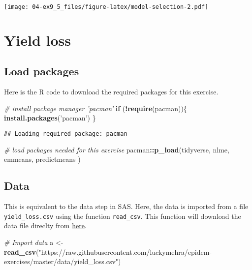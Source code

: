 \documentclass[]{book}
\newenvironment{Shaded}{\begin{snugshade}}{\end{snugshade}}
\newcommand{\CommentTok}[1]{\textcolor[rgb]{0.56,0.35,0.01}{\textit{#1}}}
\newcommand{\ControlFlowTok}[1]{\textcolor[rgb]{0.13,0.29,0.53}{\textbf{#1}}}
\newcommand{\KeywordTok}[1]{\textcolor[rgb]{0.13,0.29,0.53}{\textbf{#1}}}
\newcommand{\NormalTok}[1]{#1}
\newcommand{\OperatorTok}[1]{\textcolor[rgb]{0.81,0.36,0.00}{\textbf{#1}}}
\newcommand{\StringTok}[1]{\textcolor[rgb]{0.31,0.60,0.02}{#1}}
\begin{document}
\texttt{[image: 04-ex9\_5\_files/figure-latex/model-selection-2.pdf]}

\hypertarget{yieldloss}{%
\chapter{Yield loss}\label{yieldloss}}

\hypertarget{load-packages-4}{%
\section{Load packages}\label{load-packages-4}}

Here is the R code to download the required packages for this exercise.

\begin{Shaded}
\begin{Highlighting}[]
\CommentTok{# install package manager 'pacman'}
\ControlFlowTok{if}\NormalTok{ (}\OperatorTok{!}\KeywordTok{require}\NormalTok{(pacman))\{}
  \KeywordTok{install.packages}\NormalTok{(}\StringTok{'pacman'}\NormalTok{)}
\NormalTok{\}}
\end{Highlighting}
\end{Shaded}

\begin{verbatim}
## Loading required package: pacman
\end{verbatim}

\begin{Shaded}
\begin{Highlighting}[]
\CommentTok{# load packages needed for this exercise}
\NormalTok{pacman}\OperatorTok{::}\KeywordTok{p_load}\NormalTok{(tidyverse,}
\NormalTok{       nlme,}
\NormalTok{       emmeans,}
\NormalTok{       predictmeans}
\NormalTok{       )}
\end{Highlighting}
\end{Shaded}

\hypertarget{data-3}{%
\section{Data}\label{data-3}}

This is equivalent to the data step in SAS. Here, the data is imported from a file \texttt{yield\_loss.csv} using the function \texttt{read\_csv}. This function will download the data file direclty from \href{https://raw.githubusercontent.com/luckymehra/epidem-exercises/master/data/yield_loss.csv}{here}.

\begin{Shaded}
\begin{Highlighting}[]
\CommentTok{# Import data}
\NormalTok{a <-}\StringTok{ }\KeywordTok{read_csv}\NormalTok{(}\StringTok{"https://raw.githubusercontent.com/luckymehra/epidem-exercises/master/data/yield_loss.csv"}\NormalTok{)}
\end{Highlighting}
\end{Shaded}
\end{document}
